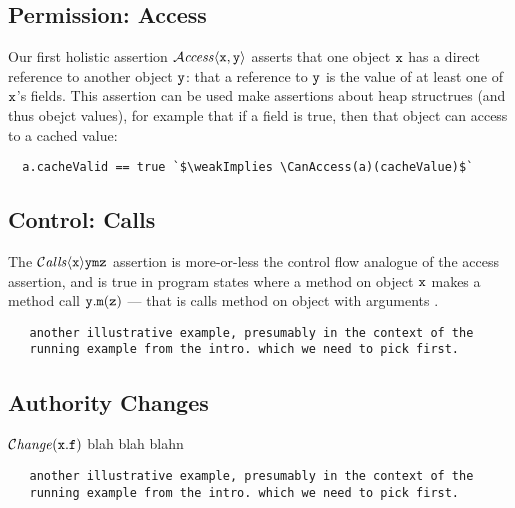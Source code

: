 
\subsection{Permission: Access}

Our first holistic assertion ${\mathcal{A}}\textrm{\textit{ccess}}\langle {\mbox{\tt{x}}},{\mbox{\tt{y}}}\rangle$ asserts that one
object ${\mbox{\tt{x}}}$ has a direct reference to another object ${\mbox{\tt{y}}}$: that a
reference to ${\mbox{\tt{y}}}$ is the value of at least one of ${\mbox{\tt{x}}}$'s fields.
This assertion can be used make assertions about heap structrues (and thus
obejct values), for example that if a  field is true,
then that object can access to a cached value:

\begin{lstlisting}
  a.cacheValid == true `$\weakImplies \CanAccess(a)(cacheValue)$` 
\end{lstlisting}



\subsection{Control: Calls}

The  ${\mathcal{C}}\textrm{\textit{alls}}\langle {\mbox{\tt{x}}}\rangle {{\mbox{\tt{y}}}} {{\mbox{\tt{m}}}} {{{\mbox{\tt{z}}}}}$
assertion is more-or-less the control flow analogue of
the access assertion, and is true 
in program states where a method on object 
${{\mbox{\tt{x}}}}$ makes a method call ${{\mbox{\tt{y}}}}.{{\mbox{\tt{m}}}}({{{\mbox{\tt{z}}}}})$ --- that is calls method 
{\m} on object {\y} with arguments {\z}.


\begin{lstlisting}
   another illustrative example, presumably in the context of the
   running example from the intro. which we need to pick first.
\end{lstlisting}


\subsection{Authority Changes}

$\mathcal{C}\textrm{\textit{hange}}({\mbox{\tt{x}}}.{\mbox{\tt{f}}})$  blah blah blahn

\begin{lstlisting}
   another illustrative example, presumably in the context of the
   running example from the intro. which we need to pick first.
\end{lstlisting}

